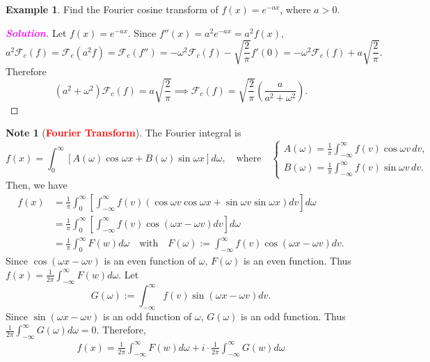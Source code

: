 \documentclass[12pt,openany]{book}
\theoremstyle{definition}
\newtheorem{example}{Example}[chapter]
\newtheorem*{note}{Note}
\newcommand{\sol}{\textcolor{magenta}{\bf Solution}}
\begin{document}
	\newpage
	\begin{example}
		Find the Fourier cosine transform of \( f(x) = e^{-ax} \), where \( a > 0 \).
		\begin{proof}[\sol]
			Let $f(x)=e^{-ax}$. Since \( f''(x) = a^2e^{-ax}=a^2 f(x) \),
			\[
			a^2 \mathcal{F}_c(f) = \mathcal{F}_c (a^2f) = \mathcal{F}_c(f'')
			= -\omega^2 \mathcal{F}_c(f) - \sqrt{\frac{2}{\pi}} f'(0) = -\omega^2 \mathcal{F}_c(f) + a\sqrt{\frac{2}{\pi}}.
			\]
			Therefore
			\[
			(a^2 + \omega^2) \mathcal{F}_c (f) = a\sqrt{\frac{2}{\pi}}
			\implies
			\mathcal{F}_c (f)= \sqrt{\frac{2}{\pi}} \left( \frac{a}{a^2 + \omega^2} \right).
			\]
		\end{proof}
	\end{example}
	
	\begin{note}[\textcolor{red}{\bf Fourier Transform}]
		The Fourier integral is
		\[ f(x) = \int_{0}^{\infty} \left[ A(\omega) \cos \omega x + B(\omega) \sin \omega x \right] d\omega,\quad\text{where}\quad\begin{cases}
			\displaystyle A(\omega) = \frac{1}{\pi} \int_{-\infty}^{\infty} f(v) \cos \omega v \, dv,\\
			\displaystyle B(\omega) = \frac{1}{\pi} \int_{-\infty}^{\infty} f(v) \sin \omega v \, dv.
		\end{cases} \]
		Then, we have
		\begin{align*}
			f(x) &= \frac{1}{\pi} \int_{0}^{\infty} \left[ \int_{-\infty}^{\infty} f(v) (\cos \omega v \cos \omega x + \sin \omega v \sin \omega x) dv \right] d\omega\\
			&= \frac{1}{\pi} \int_{0}^{\infty} \left[ \int_{-\infty}^{\infty} f(v) \cos(\omega x - \omega v) dv \right] d\omega\\
			&= \frac{1}{\pi} \int_{0}^{\infty} F(w) d\omega\quad\text{with}\quad F(\omega) := \int_{-\infty}^{\infty} f(v) \cos(\omega x - \omega v) dv.
		\end{align*}
		Since \(\cos(\omega x - \omega v)\) is an even function of \(\omega\), \(F(\omega)\) is an even function. Thus
		$\displaystyle f(x) = \frac{1}{2\pi}\int_{-\infty}^\infty F(w) d\omega.$
		Let
		\[ G(\omega) := \int_{-\infty}^{\infty} f(v) \sin(\omega x - \omega v) dv. \]
		Since \(\sin(\omega x - \omega v)\) is an odd function of \(\omega\), \(G(\omega)\) is an odd function. Thus
		$\displaystyle\frac{1}{2\pi} \int_{-\infty}^{\infty} G(\omega) d\omega=0.$
		Therefore, \begin{align*}
			f(x)=\frac{1}{2\pi} \int_{-\infty}^{\infty} F(w) d\omega + i\cdot\frac{1}{2\pi} \int_{-\infty}^{\infty} G(w) d\omega

\end{align*}
\end{note}
\end{document}
